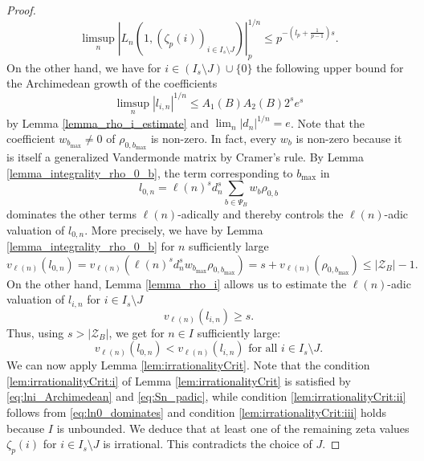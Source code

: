 \documentclass[12pt]{article}
\numberwithin{equation}{section}
\begin{document}
\begin{proof}
\begin{equation}
        \limsup_{n} |L_n(1,(\zeta_p(i))_{i\in I_s\setminus J})|_p^{1/n}\leqslant p^{-\left(l_p+\frac{1}{p-1}\right)s}.
    \end{equation}
    On the other hand, we have for $i\in (I_s\setminus J)\cup \{0\}$ the following upper bound for the Archimedean growth of the coefficients
    \begin{equation}\label{eq:lni_Archimedean}
        \limsup_{n} |l_{i,n}|^{1/n}\leqslant A_1(B)A_2(B)2^se^s
    \end{equation}
    by Lemma \ref{lemma_rho_i_estimate} and $\lim_n |d_n|^{1/n}=e$. Note that the coefficient $w_{b_{\text{max}}}\neq 0$ of $\rho_{0,b_{\text{max}}}$ is non-zero. In fact, every $w_b$ is non-zero because it is itself a generalized Vandermonde matrix by Cramer's rule. By Lemma \ref{lemma_integrality_rho_0_b}, the term corresponding to $b_{\max}$ in 
    \[
    l_{0,n}=\ell(n)^sd_n^s\sum_{b\in \Psi_B}w_b \rho_{0,b}
    \]
    dominates the other terms $\ell(n)$-adically and thereby controls the $\ell(n)$-adic valuation of $l_{0,n}$. More precisely, we have by Lemma \ref{lemma_integrality_rho_0_b} for $n$ sufficiently large
    \[
        v_{\ell(n)}(l_{0,n})=v_{\ell(n)}(\ell(n)^sd_n^sw_{b_{\max}}\rho_{0,b_{\max}})=s+v_{\ell(n)}(\rho_{0,b_{\max}})\leqslant |\mathcal{Z}_B| -1.
    \]
    On the other hand, Lemma \ref{lemma_rho_i} allows us to estimate the $\ell(n)$-adic valuation of $l_{i,n}$ for $i\in I_s\setminus J$
    \[
        v_{\ell(n)}(l_{i,n})\geqslant s.
    \]
    Thus, using $s>|\mathcal{Z}_B|$, we get for $n \in I$ sufficiently large:
    \begin{equation}\label{eq:ln0_dominates}
        v_{\ell(n)}(l_{0,n})< v_{\ell(n)}(l_{i,n}) \text{ for all }i\in I_s\setminus J.
    \end{equation}
    We can now apply Lemma \ref{lem:irrationalityCrit}. Note that the condition \ref{lem:irrationalityCrit:i} of Lemma \ref{lem:irrationalityCrit} is satisfied by \eqref{eq:lni_Archimedean} and \eqref{eq:Sn_padic}, while condition \ref{lem:irrationalityCrit:ii}  follows from \eqref{eq:ln0_dominates} and condition \ref{lem:irrationalityCrit:iii} holds because $I$ is unbounded. We deduce that at least one of the remaining zeta values $\zeta_p(i)$ for $i\in I_s\setminus J$ is irrational. This contradicts the choice of $J$.
\end{proof}

\bigskip
\end{document}
